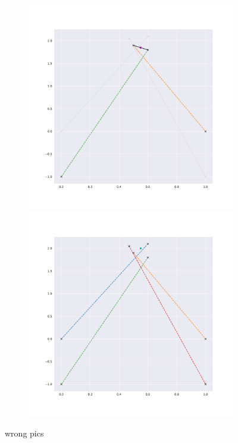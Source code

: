 \begin{figure}
\begin{subfigure}{0.23\textwidth}
        \includegraphics[width=0.9\linewidth]{Plots/stereo_magic_4.pdf}
        \includegraphics[width=0.9\linewidth]{Plots/stereo_magic_result.pdf}
    \end{subfigure}   \caption{wrong pics}
    \label{fig:stereo_disp}
\end{figure}



